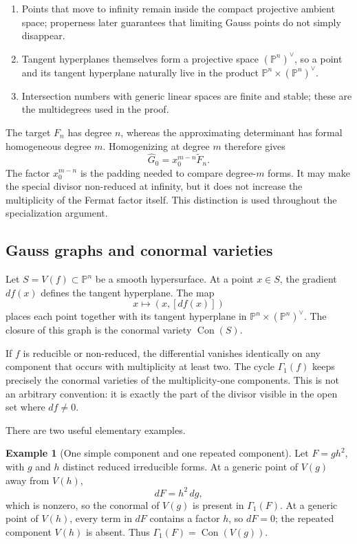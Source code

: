 \documentclass[acmsmall,screen,nonacm]{acmart}
\theoremstyle{definition}
\newtheorem{example}{Example}[section]
\theoremstyle{remark}
\DeclareMathOperator{\Con}{Con}
\newcommand{\PP}{\mathbb{P}}
\newcommand{\Gone}{\Gamma_{\!1}}
\begin{document}
\begin{enumerate}[leftmargin=2.2em,itemsep=2pt]
\item Points that move to infinity remain inside the compact projective
ambient space; properness later guarantees that limiting Gauss points do not
simply disappear.
\item Tangent hyperplanes themselves form a projective space
$(\PP^n)^\vee$, so a point and its tangent hyperplane naturally live in the
product $\PP^n\times(\PP^n)^\vee$.
\item Intersection numbers with generic linear spaces are finite and stable;
these are the multidegrees used in the proof.
\end{enumerate}

The target $F_n$ has degree $n$, whereas the approximating determinant has
formal homogeneous degree $m$.  Homogenizing at degree $m$ therefore gives
\[
  \widehat G_0=x_0^{m-n}\widetilde F_n.
\]
The factor $x_0^{m-n}$ is the padding needed to compare degree-$m$ forms.  It
may make the special divisor non-reduced at infinity, but it does not increase
the multiplicity of the Fermat factor itself.  This distinction is used
throughout the specialization argument.

\subsection{Gauss graphs and conormal varieties}

Let $S=V(f)\subset\PP^n$ be a smooth hypersurface.  At a point $x\in S$, the gradient $df(x)$ defines the tangent hyperplane.  The map
\[
  x\longmapsto (x,[df(x)])
\]
places each point together with its tangent hyperplane in
$\PP^n\times(\PP^n)^\vee$.  The closure of this graph is the conormal variety $\Con(S)$.

If $f$ is reducible or non-reduced, the differential vanishes identically on any component that occurs with multiplicity at least two.  The cycle $\Gone(f)$ keeps precisely the conormal varieties of the multiplicity-one components.  This is not an arbitrary convention: it is exactly the part of the divisor visible in the open set where $df\ne0$.

There are two useful elementary examples.

\begin{example}[One simple component and one repeated component]
Let $F=g h^2$, with $g$ and $h$ distinct reduced irreducible forms.  At a
generic point of $V(g)$ away from $V(h)$,
\[
  dF=h^2\,dg,
\]
which is nonzero, so the conormal of $V(g)$ is present in $\Gone(F)$.  At a
generic point of $V(h)$, every term in $dF$ contains a factor $h$, so
$dF=0$; the repeated component $V(h)$ is absent.  Thus
$\Gone(F)=\Con(V(g))$.
\end{example}
\end{document}
